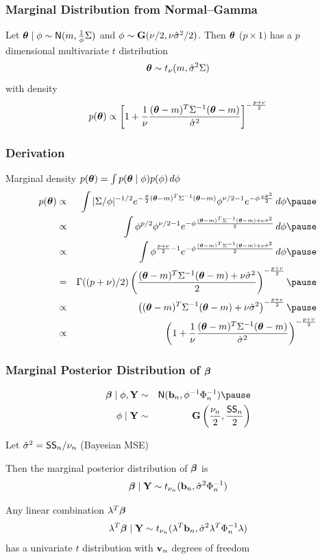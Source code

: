 \documentclass[]{beamer}
\begin{document}
\begin{frame}
  \frametitle{Marginal Distribution from Normal--Gamma }
  \begin{theorem}
    Let  $\boldsymbol{\theta} \mid \phi \sim \textsf{N}(m, \frac{1}{\phi} \Sigma)$ and $\phi \sim
    \mathbf{G}(\nu/2, \nu {\hat{\sigma}}^2/2)$. Then  $\boldsymbol{\theta}$ ($p \times 1)$ has a $p$
    dimensional multivariate $t$ distribution $$\boldsymbol{\theta} \sim t_\nu( m,
    {\hat{\sigma}}^2 \Sigma )$$ with density
$$p(\boldsymbol{\theta}) \propto  \left[ 1 + \frac{1}{\nu}  \frac{ (\boldsymbol{\theta} - m)^T
    \Sigma^{-1} (\boldsymbol{\theta} - m)}{{\hat{\sigma}}^2} \right]^{- \frac{p + \nu}{2}}$$
  \end{theorem}
\end{frame}

\begin{frame}
  \frametitle{Derivation}
Marginal density  $p(\boldsymbol{\theta}) = \int p(\boldsymbol{\theta} \mid \phi) p(\phi) \, d\phi$
\pause
\begin{eqnarray*}
  p(\t) & \propto & \int |\Sigma/\phi|^{-1/2} 
e^{- \frac{\phi}{2} (\t - m)^T
    \Sigma^{-1} (\t - m)}  \phi^{\nu/2 - 1} e^{- \phi \frac{\nu
      \shat}{2}}\, d \phi \pause \\
  & \propto & \int \phi^{p/2} \phi^{\nu/2 - 1}
e^{- \phi \frac{(\t - m)^T
    \Sigma^{-1} (\t - m)+  \nu
      \shat}{2}}\, d \phi \pause \\
 & \propto & \int \phi^{\frac{p +\nu}{2} - 1}
e^{- \phi \frac{(\t - m)^T
    \Sigma^{-1} (\t - m)+  \nu
      \shat}{2}} \, d \phi \pause \\
& = & \Gamma((p + \nu)/2 ) \left( \frac{(\t - m)^T
    \Sigma^{-1} (\t - m)+  \nu
      \shat}{2} \right)^{- \frac{p + \nu}{2}} \pause \\
& \propto &  \left( (\t - m)^T
    \Sigma^{-1} (\t - m)+  \nu
      \shat \right)^{- \frac{p + \nu}{2}} \pause \\
& \propto &  \left( 1 + \frac{1}{\nu}  \frac{(\t - m)^T
    \Sigma^{-1} (\t - m)}{\shat}
       \right)^{- \frac{p + \nu}{2}}
\end{eqnarray*}
\end{frame}

\begin{frame}
  \frametitle{Marginal Posterior Distribution of $\boldsymbol{\beta}$}
  \begin{eqnarray*}
\b \mid \phi, \Y  & \sim & \N( \bv_n, \phi^{-1} \Phi_n^{-1}) \pause \\    
 \phi \mid \Y & \sim & \G\left(\frac{\nu_n}{2},  \frac{\SS_n}{ 2} \right) 
  \end{eqnarray*}
\pause

Let ${\hat{\sigma}}^2 = \textsf{SS}_n/\nu_n$  (Bayesian MSE) \pause

Then the marginal posterior distribution of $\boldsymbol{\beta}$ is 
$$
\boldsymbol{\beta}  \mid \mathbf{Y} \sim t_{\nu_n} (\mathbf{b}_n, {\hat{\sigma}}^2 \Phi_n^{-1})
$$ \pause


Any linear combination $\lambda^T\boldsymbol{\beta}$
$$\lambda^T\boldsymbol{\beta}  \mid \mathbf{Y} \sim t_{\nu_n}
(\lambda^T\mathbf{b}_n, {\hat{\sigma}}^2 \lambda^T\Phi_n^{-1}\lambda)$$ has a univariate
$t$ distribution with $\mathbf{v}_n$ degrees of freedom

\end{frame}
\end{document}
